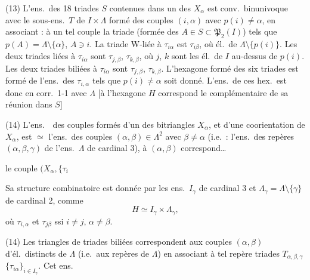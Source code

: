 \documentclass[11pt,a4paper]{article}
\begin{document}
(13) L'ens.\ des 18 triades  $S$ contenues dans un
des $X_\alpha$ est  conv.\ binunivoque avec  le
sous-ens.\ $T$ de $I \times \Lambda$ formé des couples
$(i, \alpha)$ avec $p(i) \neq \alpha$, en associant : à un tel
couple la triade  (formée des $A \in S \subset \mathfrak{P}_2(I)$) tels
que $p(A) = \Lambda \setminus \{\alpha\}$, $A \ni i$.  La triade W-liée
à $\tau_{i\alpha}$ est $\tau_{i\beta}$, où \struck{$\beta$} \uncertain{$\beta$} \struck{\ill{}}  él.\ de \struck{$\Lambda$}
$\Lambda \setminus \{p(i)\}$. Les deux triades \struck{\ill{}} liées à $\tau_{i\alpha}$ sont
$\tau_{j,\beta}$, $\tau_{k,\beta}$, où $j$, $k$ sont les  \struck{\ill{}} él.\ de  $I$
au-dessus de $p(i)$. Les deux triades biliées à $\tau_{i\alpha}$
sont $\tau_{j,\beta}$\struck{,$\ill{}$}, $\tau_{k,\beta}$. L'hexagone formé des
six triades est formé de
l'ens.\ des $\tau_{i,\alpha}$ tels que $p(i) \neq \alpha$
soit donné. L'ens.\ de ces hex.\
est donc en corr.\ 1-1 avec $\Lambda$
\struck{\ill{} \ill{} \ill{}} [à l'hexagone $H$ correspond
le complémentaire de sa réunion dans $S$]


(14) L'ens.\ \ des couples formés d'un des \struck{\ill{}} bitriangles
$X_\alpha$, et d'une coorientation de $X_\alpha$, est $\simeq$
l'ens.\ des \struck{\ill{}} couples $(\alpha, \beta) \in \Lambda^2$ avec
$\beta \neq \alpha$ (i.e.\ : l'ens.\ des repères $(\alpha,\beta,\gamma)$ de
l'ens.\ $\Lambda$ de cardinal 3), à $(\alpha,\beta)$ correspond…

le couple $(X_\alpha, \{\tau_i$

Sa structure combinatoire est donnée par les
ens.\ $I_\gamma$ de cardinal 3 et \struck{\ill{}} $\Lambda_\gamma = \Lambda \setminus \{\gamma\}$ \add{$= \{\alpha,\beta\}$} de cardinal 2,
comme
\[
H \simeq I_\gamma \times \Lambda_\gamma,
\]
où $\tau_{i,\alpha}$ et $\tau_{j\beta}$  ssi $i \neq j$, $\alpha\neq\beta$. \struck{\ill{} \ill{}}

(14) Les triangles de triades biliées
correspondent aux couples
$(\alpha, \beta)$ d'él.\ distincts de $\Lambda$
(i.e.\ aux repères de $\Lambda$) en
associant à tel repère \struck{\ill{} \ill{}}  \ill{}
triades $T_{\alpha,\beta,\gamma}$  $\{\tau_{i\alpha}\}_{i \in I_\gamma}$. Cet ens.\ \ill{}
\uncertain{W-lié} \ill{} \ill{}
\end{document}
